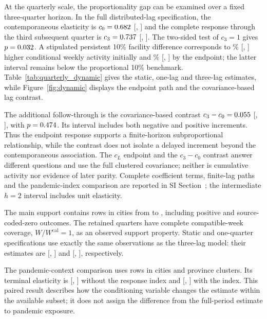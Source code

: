 \par
At the quarterly scale, the proportionality gap can be examined over a fixed three-quarter horizon. In the full distributed-lag specification, the contemporaneous elasticity is $c_0=0.682$ [\DynamicNowLow, \DynamicNowHigh] and the complete response through the third subsequent quarter is $c_3=0.737$ [\DynamicEndLow, \DynamicEndHigh]. The two-sided test of $c_3=1$ gives $p=0.032$. A stipulated persistent 10\% facility difference corresponds to \DynamicNowTen\% [\DynamicNowTenLow, \DynamicNowTenHigh] higher conditional weekly activity initially and \DynamicEndTen\% [\DynamicEndTenLow, \DynamicEndTenHigh] by the endpoint; the latter interval remains below the proportional 10\% benchmark. Table~\ref{tab:quarterly_dynamic} gives the static, one-lag and three-lag estimates, while Figure~\ref{fig:dynamic} displays the endpoint path and the covariance-based lag contrast.

The additional follow-through is the covariance-based contrast $c_3-c_0=0.055$ [\DynamicExtraLow, \DynamicExtraHigh], with $p=0.474$. Its interval includes both negative and positive increments. Thus the endpoint response supports a finite-horizon subproportional relationship, while the contrast does not isolate a delayed increment beyond the contemporaneous association. The $c_L$ endpoint and the $c_3-c_0$ contrast answer different questions and use the full clustered covariance; neither is cumulative activity nor evidence of later parity. Complete coefficient terms, finite-lag paths and the pandemic-index comparison are reported in SI Section~; the intermediate $h=2$ interval includes unit elasticity.

The main support contains \DynamicRows{} rows in \DynamicCities{} cities from \DynamicStart{} to \DynamicEndQuarter, including \DynamicPositiveRows{} positive and \DynamicZeroRows{} source-coded-zero outcomes. The retained quarters have complete compatible-week coverage, $W/W^{\mathrm{cal}}=1$, as an observed support property. Static and one-quarter specifications use exactly the same observations as the three-lag model: their estimates are \StaticQuarter{} [\StaticQuarterLow, \StaticQuarterHigh] and \OneLagQuarter{} [\OneLagQuarterLow, \OneLagQuarterHigh], respectively.

The pandemic-context comparison uses \CovidDynamicRows{} rows in \CovidDynamicCities{} cities and \CovidDynamicProvinces{} province clusters. Its terminal elasticity is \CovidBase{} [\CovidBaseLow, \CovidBaseHigh] without the response index and \CovidAdjusted{} [\CovidAdjustedLow, \CovidAdjustedHigh] with the index. This paired result describes how the conditioning variable changes the estimate within the available subset; it does not assign the difference from the full-period estimate to pandemic exposure.


\FloatBarrier
